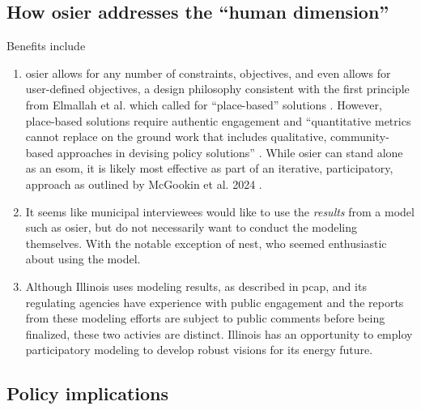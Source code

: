 \subsection{How \ac{osier} addresses the ``human dimension''}
Benefits include
\begin{enumerate}
    \item \ac{osier} allows for any number of constraints, objectives, and even
    allows for user-defined objectives, a design philosophy consistent with the
    first principle from Elmallah et al. which called for ``place-based''
    solutions \cite{elmallah_frontlining_2022}. However, place-based solutions
    require authentic engagement and ``quantitative metrics cannot replace on
    the ground work that includes qualitative, community-based approaches in
    devising policy solutions'' \cite{elmallah_frontlining_2022}. While
    \ac{osier} can stand alone as an \ac{esom}, it is likely most effective as
    part of an iterative, participatory, approach as outlined by McGookin et al.
    2024 \cite{mcgookin_advancing_2024}.
    \item It seems like municipal interviewees would like to use the \textit{results} from a model
    such as \ac{osier}, but do not necessarily want to conduct the modeling themselves. With the
    notable exception of \ac{nest}, who seemed enthusiastic about using the model.
    \item Although Illinois uses modeling results, as described in \ac{pcap}, and its regulating agencies
    have experience with public engagement and the reports from these modeling efforts are subject to public
    comments before being finalized, these two activies are distinct. Illinois has an opportunity to 
    employ participatory modeling to develop robust visions for its energy future.
\end{enumerate}

\subsection{Policy implications}